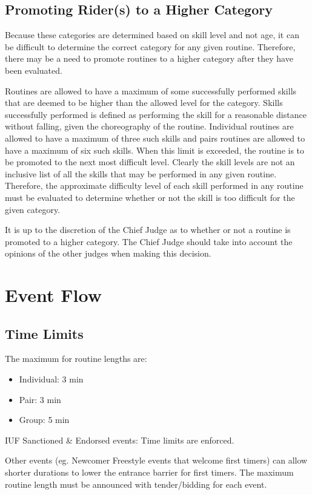 \subsection{Promoting Rider(s) to a Higher Category}
Because these categories are determined based on skill level and not age, it can be difficult to determine the correct category for any given routine.
Therefore, there may be a need to promote routines to a higher category after they have been evaluated.

Routines are allowed to have a maximum of some successfully performed skills that are deemed to be higher than the allowed level for the category.
Skills successfully performed is defined as performing the skill for a reasonable distance without falling, given the choreography of the routine.
Individual routines are allowed to have a maximum of three such skills and pairs routines are allowed to have a maximum of six such skills.
When this limit is exceeded, the routine is to be promoted to the next most difficult level.
Clearly the skill levels are not an inclusive list of all the skills that may be performed in any given routine.
Therefore, the approximate difficulty level of each skill performed in any routine must be evaluated to determine whether or not the skill is too difficult for the given category.

It is up to the discretion of the Chief Judge as to whether or not a routine is promoted to a higher category.
The Chief Judge should take into account the opinions of the other judges when making this decision.

\section{Event Flow}

\subsection{Time Limits}

The maximum for routine lengths are:
\begin{itemize}
	\item Individual: 3 min
	\item Pair: 3 min
	\item Group: 5 min
\end{itemize}

IUF Sanctioned \& Endorsed events: Time limits are enforced.

Other events (eg. Newcomer Freestyle events that welcome first timers) can allow shorter durations to lower the entrance barrier for first timers.
The maximum routine length must be announced with tender/bidding for each event.

